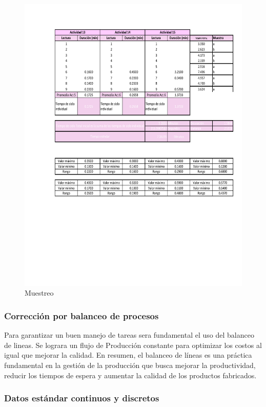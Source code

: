     \begin{figure}[H]
        \centering
        \includegraphics[scale=0.3]{9/Img/muestreoUno.pdf}
        \caption{Muestreo}
        \label{fig:muestreo}
    \end{figure}
    \subsubsection{Corrección por balanceo de procesos}
    Para garantizar un buen manejo de tareas sera fundamental el uso del balanceo de lineas. Se lograra un flujo de Producción constante para optimizar los costos al igual que mejorar la calidad.
    En resumen, el balanceo de líneas es una práctica fundamental en la gestión de la producción que busca mejorar la productividad, reducir los tiempos de espera y aumentar la calidad de los productos fabricados.
    \subsubsection{Datos estándar continuos y discretos}
    
